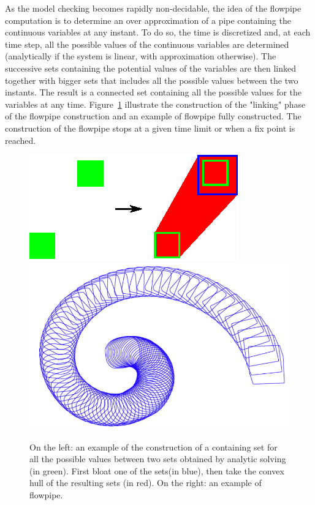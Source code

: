 As the model checking becomes rapidly non-decidable, the idea of the flowpipe computation is to determine an over approximation of a pipe containing the continuous variables at any instant. To do so, the time is discretized and, at each time step, all the possible values of the continuous variables are determined (analytically if the system is linear, with approximation otherwise). The successive sets containing the potential values of the variables are then linked together with bigger sets that includes all the possible values between the two instants. The result is a connected set containing all the possible values for the variables at any time. Figure~\ref{fowpipeconstruction} illustrate the construction of the "linking" phase of the flowpipe construction and an example of flowpipe fully constructed. The construction of the flowpipe stops at a given time limit or when a fix point is reached.

\begin{figure}
\includegraphics[scale=1]{images/flowpipe.eps}
\includegraphics[scale=0.2]{images/zono.png}
\caption{On the left: an example of the construction of a containing set for all the possible values between two sets obtained by analytic solving (in green). First bloat one of the sets(in blue), then take the convex hull of the resulting sets (in red). On the right: an example of flowpipe.}
\label{fowpipeconstruction}
\end{figure}

